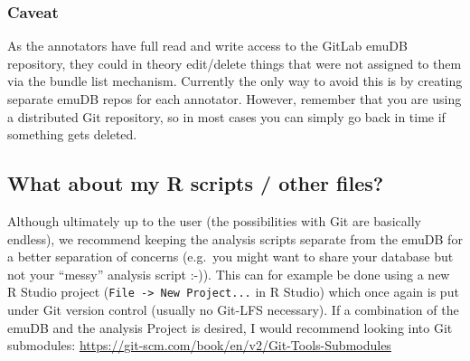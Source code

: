 \documentclass[]{book}
\begin{document}
\hypertarget{caveat}{%
\subsubsection{Caveat}\label{caveat}}

As the annotators have full read and write access to the GitLab emuDB repository, they could in theory edit/delete things that were not assigned to them via the bundle list mechanism. Currently the only way to avoid this is by creating separate emuDB repos for each annotator. However, remember that you are using a distributed Git repository, so in most cases you can simply go back in time if something gets deleted.

\hypertarget{what-about-my-r-scripts-other-files}{%
\subsection{What about my R scripts / other files?}\label{what-about-my-r-scripts-other-files}}

Although ultimately up to the user (the possibilities with Git are basically endless), we recommend keeping the analysis scripts separate from the emuDB for a better separation of concerns (e.g.~you might want to share your database but not your ``messy'' analysis script :-)). This can for example be done using a new R Studio project (\texttt{File\ -\textgreater{}\ New\ Project...} in R Studio) which once again is put under Git version control (usually no Git-LFS necessary). If a combination of the emuDB and the analysis Project is desired, I would recommend looking into Git submodules: \url{https://git-scm.com/book/en/v2/Git-Tools-Submodules}


\end{document}
